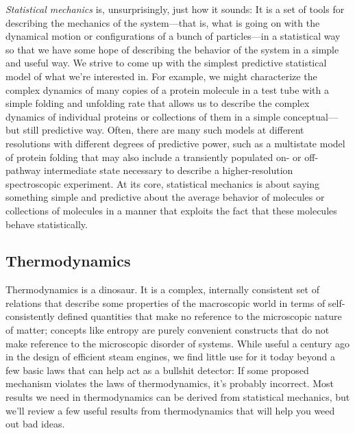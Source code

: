 \documentclass[english,course]{lecture}
\begin{document}

\emph{Statistical mechanics} is, unsurprisingly, just how it sounds: It is a set of tools for describing the mechanics of the system---that is, what is going on with the dynamical motion or configurations of a bunch of particles---in a statistical way so that we have some hope of describing the behavior of the system in a simple and useful way.
We strive to come up with the simplest predictive statistical model of what we're interested in.
For example, we might characterize the complex dynamics of many copies of a protein molecule in a test tube with a simple folding and unfolding rate that allows us to describe the complex dynamics of individual proteins or collections of them in a simple conceptual---but still predictive way.
Often, there are many such models at different resolutions with different degrees of predictive power, such as a multistate model of protein folding that may also include a transiently populated on- or off-pathway intermediate state necessary to describe a higher-resolution spectroscopic experiment.
At its core, statistical mechanics is about saying something simple and predictive about the average behavior of molecules or collections of molecules in a manner that exploits the fact that these molecules behave statistically.


\subsection{Thermodynamics}

Thermodynamics is a dinosaur.
It is a complex, internally consistent set of relations that describe some properties of the macroscopic world in terms of self-consistently defined quantities that make no reference to the microscopic nature of matter; concepts like entropy are purely convenient constructs that do not make reference to the microscopic disorder of systems.
While useful a century ago in the design of efficient steam engines, we find little use for it today beyond a few basic laws that can help act as a bullshit detector: If some proposed mechanism violates the laws of thermodynamics, it's probably incorrect.
Most results we need in thermodynamics can be derived from statistical mechanics, but we'll review a few useful results from thermodynamics that will help you weed out bad ideas.

\end{document}
